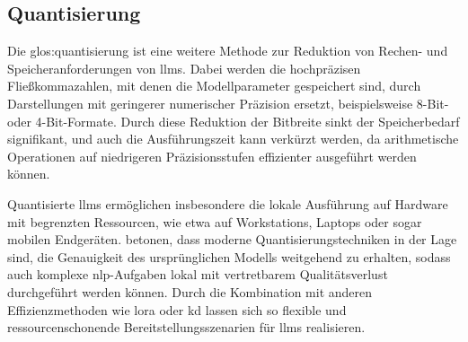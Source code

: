 
\subsection{Quantisierung}

Die \gls{glos:quantisierung} ist eine weitere Methode zur Reduktion von Rechen- und Speicheranforderungen von \glspl{llm}.
Dabei werden die hochpräzisen Fließkommazahlen, mit denen die Modellparameter gespeichert sind, durch Darstellungen mit geringerer numerischer Präzision ersetzt, beispielsweise 8-Bit- oder 4-Bit-Formate.
Durch diese Reduktion der Bitbreite sinkt der Speicherbedarf signifikant, und auch die Ausführungszeit kann verkürzt werden, da arithmetische Operationen auf niedrigeren Präzisionsstufen effizienter ausgeführt werden können\autocite{egashira_exploiting_2024}.

Quantisierte \glspl{llm} ermöglichen insbesondere die lokale Ausführung auf Hardware mit begrenzten Ressourcen, wie etwa auf Workstations, Laptops oder sogar mobilen Endgeräten.
\citeauthor{egashira_exploiting_2024} betonen, dass moderne Quantisierungstechniken in der Lage sind, die Genauigkeit des ursprünglichen Modells weitgehend zu erhalten, sodass auch komplexe \gls{nlp}-Aufgaben lokal mit vertretbarem Qualitätsverlust durchgeführt werden können\autocite{egashira_exploiting_2024}.
Durch die Kombination mit anderen Effizienzmethoden wie \gls{lora} oder \gls{kd} lassen sich so flexible und ressourcenschonende Bereitstellungsszenarien für \glspl{llm} realisieren.



